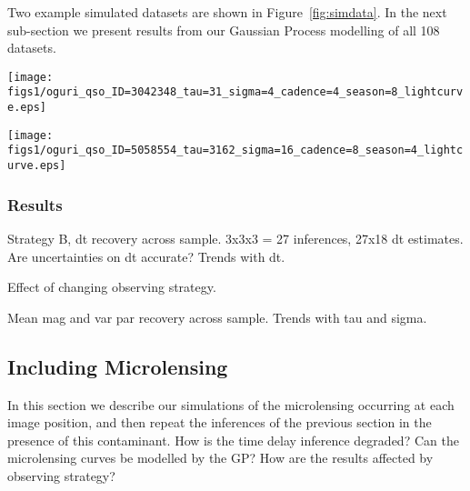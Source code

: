 \documentclass[useAMS,usenatbib, a4paper]{mn2e} \usepackage{natbib}
\begin{document}

Two example simulated datasets are shown in Figure~\ref{fig:simdata}. In  the
next sub-section we present results from our Gaussian Process modelling of all 108
datasets. 

\begin{figure*}
\begin{minipage}{0.48\linewidth}
\centering\texttt{[image: figs1/oguri\_qso\_ID=3042348\_tau=31\_sigma=4\_cadence=4\_season=8\_lightcurve.eps]}
\end{minipage}
\begin{minipage}{0.48\linewidth}
\centering\texttt{[image: figs1/oguri\_qso\_ID=5058554\_tau=3162\_sigma=16\_cadence=8\_season=4\_lightcurve.eps]}
\end{minipage}\hfill
\caption{Two example simulated lensed AGN datasets (with no microlensing).
Left: a minimally-variable source ($\tau_q = 31.62$ days, $\sigma_q = 0.004$),
lensed into a cross configuration (lens ID 3042348), and monitored with high
cadence and long season length (4 days, 8 months, strategy D). Right: a
maaximally-variable source ($\tau_q = 3162$ days, $\sigma_q = 0.016$), lensed
into a major axis cusp configuration (lens ID 5058554), and monitored with low
cadence and short season length (8 days, 4 months, strategy A).
\label{fig:simdata}}
\end{figure*}


\subsubsection{Results}

Strategy B, dt recovery across sample. 3x3x3 = 27 inferences, 27x18 dt estimates. Are
uncertainties on dt accurate? Trends with dt.

Effect of changing observing strategy.

Mean mag and var par recovery across sample. Trends with tau and sigma.




\subsection{Including Microlensing}

In this section we describe our simulations of the microlensing occurring at
each image position, and then repeat the inferences of the previous section in
the presence of this contaminant. How is the time delay inference degraded?
Can the microlensing curves be modelled by the GP? How are the results
affected by observing strategy?
\end{document}
